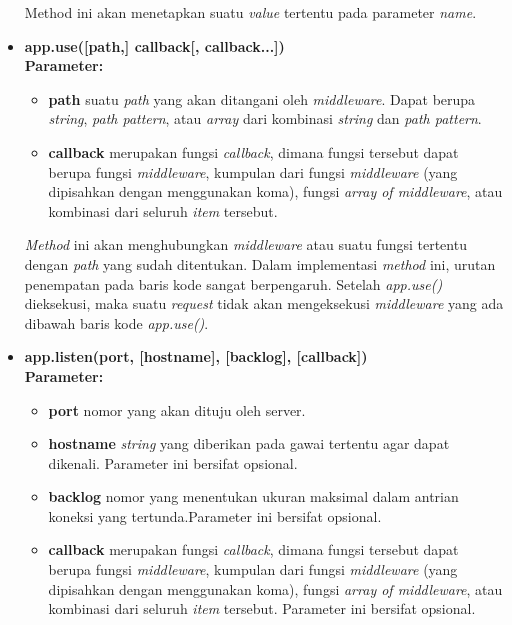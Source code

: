 \begin{itemize}
	Method ini akan menetapkan suatu \textit{value} tertentu pada parameter \textit{name}.

	\item \textbf{app.use([path,] callback[, callback...])} \\ \textbf{Parameter:} 
	\begin{itemize}
		\item \textbf{path} suatu \textit{path} yang akan ditangani oleh \textit{middleware}. Dapat berupa \textit{string}, \textit{path pattern}, atau \textit{array} dari kombinasi \textit{string} dan \textit{path pattern}.
		
		\item \textbf{callback} merupakan fungsi \textit{callback}, dimana fungsi tersebut dapat berupa fungsi \textit{middleware}, kumpulan dari fungsi \textit{middleware} (yang dipisahkan dengan menggunakan koma), fungsi \textit{array of middleware}, atau kombinasi dari seluruh \textit{item} tersebut.
	\end{itemize}
	
	\textit{Method} ini akan menghubungkan \textit{middleware} atau suatu fungsi tertentu dengan \textit{path} yang sudah ditentukan. Dalam implementasi \textit{method} ini, urutan penempatan pada baris kode sangat berpengaruh. Setelah \textit{app.use()} dieksekusi, maka suatu \textit{request} tidak akan mengeksekusi \textit{middleware} yang ada dibawah baris kode \textit{app.use()}. 
	
%	

	\item \textbf{app.listen(port, [hostname], [backlog], [callback])} \\ \textbf{Parameter:}
	\begin{itemize}
		\item \textbf{port} nomor yang akan dituju oleh server.
		\item \textbf{hostname} \textit{string} yang diberikan pada gawai tertentu agar dapat dikenali. Parameter ini bersifat opsional.
		\item \textbf{backlog} nomor yang menentukan ukuran maksimal dalam antrian koneksi yang tertunda.Parameter ini bersifat opsional.
		\item \textbf{callback} merupakan fungsi \textit{callback}, dimana fungsi tersebut dapat berupa fungsi \textit{middleware}, kumpulan dari fungsi \textit{middleware} (yang dipisahkan dengan menggunakan koma), fungsi \textit{array of middleware}, atau kombinasi dari seluruh \textit{item} tersebut. Parameter ini bersifat opsional.
	\end{itemize}
	

\end{itemize}
